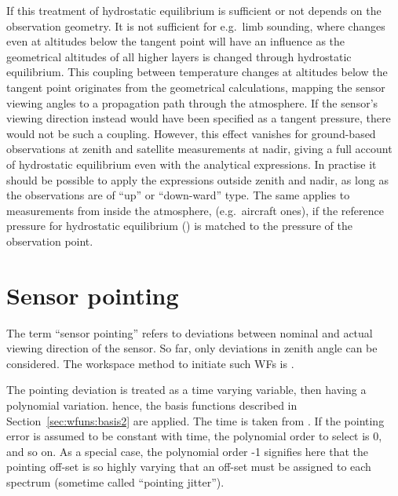 If this treatment of hydrostatic equilibrium is sufficient or not depends on
the observation geometry. It is not sufficient for e.g.\ limb sounding, where
changes even at altitudes below the tangent point will have an influence as the
geometrical altitudes of all higher layers is changed through hydrostatic
equilibrium. This coupling between temperature changes at altitudes below the
tangent point originates from the geometrical calculations, mapping the sensor
viewing angles to a propagation path through the atmosphere. If the sensor's
viewing direction instead would have been specified as a tangent pressure, there
would not be such a coupling. However, this effect vanishes for ground-based
observations at zenith and satellite measurements at nadir, giving a full
account of hydrostatic equilibrium even with the analytical expressions. In
practise it should be possible to apply the expressions outside zenith and
nadir, as long as the observations are of ``up'' or ``down-ward'' type. The
same applies to measurements from inside the atmosphere, (e.g.\ aircraft ones),
if the reference pressure for hydrostatic equilibrium ()
is matched to the pressure of the observation point.





\section{Sensor pointing}
\label{sec:wfuns:sensorpointing}

The term ``sensor pointing'' refers to deviations between nominal and
actual viewing direction of the sensor. So far, only deviations in zenith angle
can be considered. The workspace method to initiate such WFs is
.

The pointing deviation is treated as a time varying variable, then having a
polynomial variation. hence, the basis functions described in
Section~\ref{sec:wfuns:basis2} are applied. The time is taken from
. If the pointing error is assumed to be constant with
time, the polynomial order to select is 0, and so on. As a special case, the
polynomial order -1 signifies here that the pointing off-set is so highly
varying that an off-set must be assigned to each spectrum
(sometime called ``pointing jitter'').

